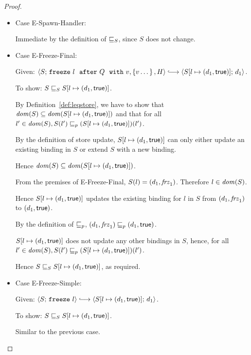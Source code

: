\begin{proof}
\begin{itemize}
    \item Case {\sc E-Spawn-Handler}:

      Immediate by the definition of $ \sqsubseteq_S $, since $S$ does
      not change.

    \item Case {\sc E-Freeze-Final}:

      Given: $\config{S}{\freezeafterfull{l}{Q}{v}{\setof{v\dots}}{H}}
      \parstepsto \config{\extS{S}{l}{d_1}{\frozentrue}}{d_1}$.

      To show: $S \sqsubseteq_S S[l \mapsto (d_1, \textsf{true})]$.

      By Definition~\ref{def:leqstore}, we have to show that $\mathit{dom}(S)
      \subseteq \mathit{dom}(S[l \mapsto (d_1, \textsf{true})])$ and that for all
      $l' \in \mathit{dom}(S), \\
      S(l') \sqsubseteq_p (S[l \mapsto (d_1, \textsf{true})])(l')$.


      By the definition of store update,
      $S[l \mapsto (d_1, \textsf{true})]$ can only either update an
      existing binding in $S$ or extend $S$ with a new binding.

      Hence $\mathit{dom}(S) \subseteq \mathit{dom}(S[l \mapsto (d_1, \textsf{true})])$.

      From the premises of {\sc E-Freeze-Final}, $S(l) =
      (d_1, \mathit{frz}_1)$.  Therefore $l \in \mathit{dom}(S)$.

      Hence $S[l \mapsto (d_1, \textsf{true})]$ updates the existing
      binding for $l$ in $S$ from $(d_1, \mathit{frz}_1)$ to
      $(d_1, \textsf{true})$.

      By the definition of $\sqsubseteq_p$, $(d_1, \mathit{frz}_1) \sqsubseteq_p
      (d_1, \textsf{true})$.

      $S[l \mapsto (d_1, \textsf{true})]$ does not update any other
      bindings in $S$, hence, for all $l' \in \mathit{dom}(S), \\
      S(l') \sqsubseteq_p (S[l \mapsto (d_1, \textsf{true})])(l')$.

      Hence $S \sqsubseteq_S S[l \mapsto (d_1, \textsf{true})]$, as
      required.

    \item Case {\sc E-Freeze-Simple}:

      Given: $\config{S}{\freeze{l}} \parstepsto
      \config{\extS{S}{l}{d_1}{\frozentrue}}{d_1}$.

      To show: $S \sqsubseteq_S S[l \mapsto (d_1, \textsf{true})]$.

      Similar to the previous case.

  \end{itemize}

\end{proof}
